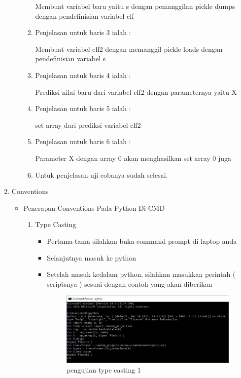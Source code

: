 \begin{enumerate}
\begin{itemize}
\begin{enumerate}
\par Membuat variabel baru yaitu s dengan pemanggilan pickle dumps dengan pendefinisian variabel clf
\par
\item Penjelasan untuk baris 3  ialah :
\par Membuat variabel clf2 dengan memanggil pickle loads dengan pendefinisian variabel s
\par
\item Penjelasan untuk baris 4  ialah :
\par Prediksi nilai baru dari variabel clf2 dengan parameternya yaitu X
\par
\item Penjelasan untuk baris 5  ialah :
\par set array dari prediksi variabel clf2
\par
\item Penjelasan untuk baris 6 ialah : 
\par Parameter X dengan array 0 akan menghasilkan set array 0 juga
\par
\par
\item Untuk penjelasan uji cobanya sudah selesai.
\par
\end{enumerate}
\end{itemize}


\par
\item Conventions
\begin{itemize}
\item Penerapan Conventions Pada Python Di CMD
\begin{enumerate}
\item Type Casting
\begin{itemize}
\item Pertama-tama silahkan buka command prompt di laptop anda
\item Selanjutnya masuk ke python 
\item Setelah masuk kedalam python, silahkan masukkan perintah ( scriptsnya ) sesuai dengan contoh yang akan diberikan
\par

\begin{figure}[ht]
\centering
\includegraphics[scale=0.3]{figures/typecast1.jpg}
\caption{pengujian type casting 1}
\label{contoh}
\end{figure}


\end{itemize}
\end{enumerate}
\end{itemize}
\end{enumerate}

